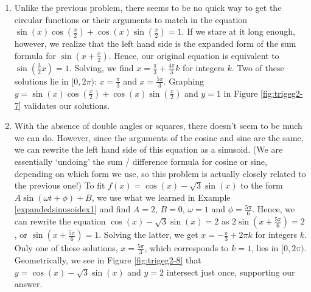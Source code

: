 {\begin{enumerate}
from which we get $\cos(x) = 0$ or $\sin(x) = \frac{\sqrt{3}}{2}$. From $\cos(x) = 0$, we obtain $x = \frac{\pi}{2} + \pi k$ for integers $k$. From $\sin(x) = \frac{\sqrt{3}}{2}$, we get $x = \frac{\pi}{3} + 2\pi k$ or $x = \frac{2\pi}{3} + 2\pi k$ for integers $k$.  The answers which lie in $[0,2\pi)$ are $x = \frac{\pi}{2}$, $\frac{3\pi}{2}$, $\frac{\pi}{3}$ and $\frac{2\pi}{3}$.  We graph $y = \sin(2x)$ and $y = \sqrt{3} \cos(x)$ in Figure \ref{fig:trigeg2-6} to  verify our answers.




\item Unlike the previous problem, there seems to be no quick way to get the circular functions or their arguments to match in the equation $\sin(x)\cos\left(\frac{x}{2}\right) + \cos(x)\sin\left(\frac{x}{2}\right) = 1$.  If we stare at it long enough, however,  we realize that the left hand side is the expanded form of the sum formula for $\sin\left(x + \frac{x}{2}\right)$.  Hence, our original equation is equivalent to  $\sin\left(\frac{3}{2} x\right) = 1$.  Solving, we find $x = \frac{\pi}{3} + \frac{4\pi}{3} k$ for integers $k$.  Two of these solutions lie in $[0,2\pi)$: $x = \frac{\pi}{3}$ and $x = \frac{5\pi}{3}$. Graphing $y = \sin(x)\cos\left(\frac{x}{2}\right) + \cos(x)\sin\left(\frac{x}{2}\right)$ and $y = 1$ in Figure \ref{fig:trigeg2-7}  validates our solutions.


\item  With the absence of double angles or squares, there doesn't seem to be much we can do.  However, since the arguments of the cosine and sine are the same, we can rewrite the left hand side of this equation as a sinusoid. (We are essentially `undoing' the sum / difference formula for cosine or sine, depending on which form we use, so this problem is actually closely related to the previous one!)  To fit $f(x) = \cos(x) - \sqrt{3} \sin(x)$ to the form $A\sin(\omega t + \phi) + B$, we use what we learned in Example \ref{expandedsinusoidex1} and find $A = 2$, $B = 0$, $\omega = 1$ and $\phi = \frac{5\pi}{6}$.   Hence, we can rewrite the equation  $\cos(x) - \sqrt{3} \sin(x) = 2$  as $2 \sin\left(x + \frac{5\pi}{6}\right) = 2$, or $\sin\left(x + \frac{5\pi}{6}\right) = 1$.  Solving the latter, we get $x  = - \frac{\pi}{3} + 2\pi k$ for integers $k$. Only one of these solutions, $x = \frac{5\pi}{3}$, which corresponds to $k=1$, lies in $[0,2\pi)$.  Geometrically, we see in Figure \ref{fig:trigeg2-8} that $y = \cos(x) - \sqrt{3} \sin(x)$ and $y = 2$ intersect just once, supporting our answer.


\end{enumerate}
}
 
